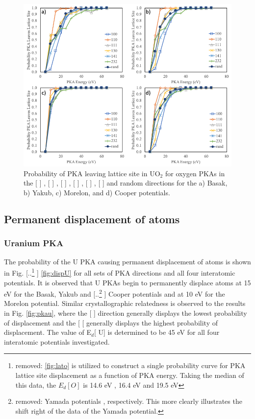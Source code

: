 \documentclass[review]{elsarticle} %
\providecommand{\DIFaddtex}[1]{{\protect\color{blue} \sf #1}} %
\providecommand{\DIFdeltex}[1]{{\protect\color{red} [..\footnote{removed: #1} ]}} %
\providecommand{\DIFaddbegin}{} %
\providecommand{\DIFaddend}{} %
\providecommand{\DIFdelbegin}{} %
\providecommand{\DIFdelend}{} %
\providecommand{\DIFaddFL}[1]{\DIFadd{#1}} %
\providecommand{\DIFadd}[1]{\texorpdfstring{\DIFaddtex{#1}}{#1}} %
\providecommand{\DIFdel}[1]{\texorpdfstring{\DIFdeltex{#1}}{}} %
\newcommand{\DIFscaledelfig}{0.5}
\newlength{\DIFdelgraphicswidth} %
\newlength{\DIFdelgraphicsheight} %
\newcommand{\DIFaddincludegraphics}[2][]{{\color{blue}\fbox{\DIFOincludegraphics[#1]{#2}}}} %
\newcommand{\DIFdelincludegraphics}[2][]{%
\sbox{\DIFdelgraphicsbox}{\DIFOincludegraphics[#1]{#2}}%
\settoboxwidth{\DIFdelgraphicswidth}{\DIFdelgraphicsbox} %
\settoboxtotalheight{\DIFdelgraphicsheight}{\DIFdelgraphicsbox} %
\scalebox{\DIFscaledelfig}{%
\parbox[b]{\DIFdelgraphicswidth}{\usebox{\DIFdelgraphicsbox}\\[-\baselineskip] \rule{\DIFdelgraphicswidth}{0em}}\llap{\resizebox{\DIFdelgraphicswidth}{\DIFdelgraphicsheight}{%
\setlength{\unitlength}{\DIFdelgraphicswidth}%
\begin{picture}(1,1)%
\thicklines\linethickness{2pt} %
{\color[rgb]{1,0,0}\put(0,0){\framebox(1,1){}}}%
{\color[rgb]{1,0,0}\put(0,0){\line( 1,1){1}}}%
{\color[rgb]{1,0,0}\put(0,1){\line(1,-1){1}}}%
\end{picture}%
}\hspace*{3pt}}} %
} %
\DeclareRobustCommand{\DIFaddbegin}{\DIFOaddbegin \let\includegraphics\DIFaddincludegraphics} %
\DeclareRobustCommand{\DIFaddend}{\DIFOaddend \let\includegraphics\DIFOincludegraphics} %
\DeclareRobustCommand{\DIFdelbegin}{\DIFOdelbegin \let\includegraphics\DIFdelincludegraphics} %
\DeclareRobustCommand{\DIFdelend}{\DIFOaddend \let\includegraphics\DIFOincludegraphics} %
\begin{document}
\begin{figure}[h]
 \centering
 \includegraphics[width=1.0\textwidth]{pka_Opka.png}
 \caption{\DIFaddFL{Probability of PKA leaving lattice site in UO$_2$ for oxygen PKAs in the }[\DIFaddFL{100}]\DIFaddFL{, }[\DIFaddFL{110}]\DIFaddFL{, }[\DIFaddFL{111}]\DIFaddFL{, }[\DIFaddFL{130}]\DIFaddFL{, }[\DIFaddFL{141}]\DIFaddFL{, }[\DIFaddFL{232}] \DIFaddFL{and random directions for the a) Basak, b) Yakub, c) Morelon, and d) Cooper potentials.}}
 \label{fig:pkao}
\end{figure}

\FloatBarrier

\subsection{\DIFadd{Permanent displacement of atoms}}\label{sect2}

\subsubsection{\DIFadd{Uranium PKA}}

\DIFadd{The probability of the U PKA causing permanent displacement of atoms is shown }\DIFaddend in Fig. \DIFdelbegin \DIFdel{\ref{fig:lato} is utilized to construct a single probability curve for PKA lattice site displacement as a function of PKA energy. Taking the median of this data, the $E_d [O]$ is 14.6 eV , 16.4 eV and 19.5 eV }\DIFdelend \DIFaddbegin \DIFadd{\ref{fig:dispU} for all sets of PKA directions and all four interatomic potentials. It is observed that U PKAs begin to permanently displace atoms at 15 eV }\DIFaddend for the Basak, Yakub and \DIFdelbegin \DIFdel{Yamada potentials , respectively. This more clearly illustrates the shift right of the data of the Yamada potential. }\DIFdelend \DIFaddbegin \DIFadd{Cooper potentials and at 10 eV for the Morelon potential. Similar crystallographic relatedness is observed to the results in Fig. \ref{fig:pkau}, where the }[\DIFadd{110}] \DIFadd{direction generally displays the lowest probability of displacement and the }[\DIFadd{100}[ \DIFadd{generally displays the highest probability of displacement. The value of E$_d$}[\DIFadd{U}] \DIFadd{is determined to be 45 eV for all four interatomic potentials investigated.
}\DIFaddend 
\end{document}
